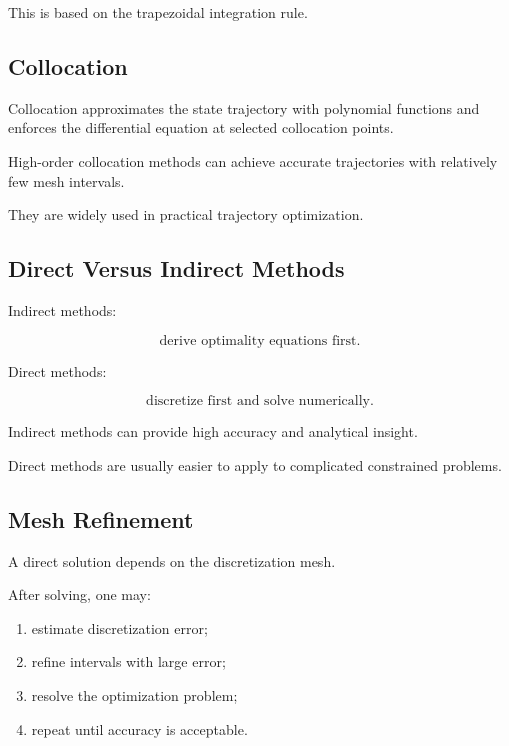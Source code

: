This is based on the trapezoidal integration rule.

\subsection{Collocation}
\label{subsec:optimal-control-collocation}

Collocation approximates the state trajectory with polynomial functions
and enforces the differential equation at selected collocation points.

High-order collocation methods can achieve accurate trajectories with
relatively few mesh intervals.

They are widely used in practical trajectory optimization.

\subsection{Direct Versus Indirect Methods}
\label{subsec:direct-versus-indirect}

Indirect methods:

\[
\boxed{
\text{derive optimality equations first}.
}
\]

Direct methods:

\[
\boxed{
\text{discretize first and solve numerically}.
}
\]

Indirect methods can provide high accuracy and analytical insight.

Direct methods are usually easier to apply to complicated constrained
problems.

\subsection{Mesh Refinement}
\label{subsec:optimal-control-mesh-refinement}

A direct solution depends on the discretization mesh.

After solving, one may:

\begin{enumerate}
    \item estimate discretization error;
    \item refine intervals with large error;
    \item resolve the optimization problem;
    \item repeat until accuracy is acceptable.
\end{enumerate}

